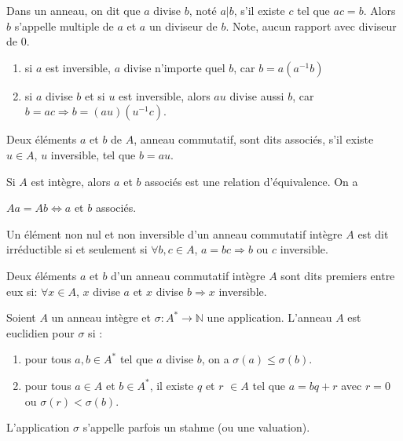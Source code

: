 \documentclass[12pt,a4paper]{article}
\begin{document}
\begin{flushleft}
\begin{mydef}
Dans un anneau, on dit que $a$ divise $ b $, noté $ a | b $, s'il existe $ c $ tel que $ ac = b $. Alors $ b $ s'appelle multiple de $ a $ et $ a $ un diviseur de  $b $. Note, aucun rapport avec diviseur de $ 0 $.
\end{mydef}

\begin{rem}
\begin{enumerate}
\item si $ a $ est inversible, $ a $ divise n'importe quel $ b $, car $ b = a (a^{-1} b) $
\item si $ a $ divise $ b $ et si $ u $ est inversible, alors $ au $ divise aussi $ b $, car $b = ac \Rightarrow b = (au) (u^{-1} c)$.
\end{enumerate}
\end{rem}

\begin{mydef}
Deux éléments $a$ et $b$ de $A$, anneau commutatif, sont dits associés, s'il existe $u \in A$, $u$ inversible, tel que $ b = au$.
\end{mydef}

\begin{prop}
Si $A$ est intègre, alors $a$ et $b$ associés est une relation d'équivalence. On a\\
\begin{center}
$Aa = Ab \Leftrightarrow a $ et $b$ associés.
\end{center}
\end{prop}

\begin{mydef}
Un élément non nul et non inversible d'un anneau commutatif intègre $A$ est dit irréductible si et seulement si  $\forall b , c \in A$, $a = bc \Rightarrow b $ ou $c$ inversible.
\end{mydef}

\begin{mydef}
Deux éléments $a$ et $b$ d'un anneau commutatif intègre $A$ sont dits premiers entre eux si: $\forall x \in A$, $x $ divise $a$ et $x$ divise $b \Rightarrow x$ inversible.
\end{mydef}

\begin{mydef}
Soient $A$ un anneau intègre et $\sigma : A^* \longrightarrow \mathbb{N}$ une application. L'anneau $A$ est euclidien pour $\sigma$ si :
\begin{enumerate}
\item pour tous $a, b \in A^*$ tel que $a$ divise $b$, on a $\sigma(a) \leq \sigma(b)$.
\item pour tous $a \in A$ et $b \in A^*$, il existe $q$ et $r$ $\in A$ tel que $a = bq + r$ avec $r = 0$ ou $\sigma(r) < \sigma(b)$.
\end{enumerate}
L'application $\sigma$ s'appelle parfois un stahme (ou une valuation).
\end{mydef}


\end{flushleft}
\end{document}
